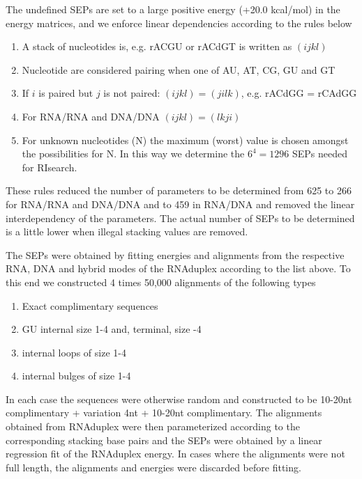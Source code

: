 The undefined SEPs are set to a large positive energy (+20.0 kcal/mol) in the energy matrices, and we enforce linear dependencies according to the rules below

\begin{enumerate}
\item A stack of nucleotides is, e.g. rACGU or rACdGT is written as $(\mathit{ijkl})$

\item Nucleotide are considered pairing when one of AU, AT, CG, GU and GT

\item If $i$ is paired but $j$ is not paired: $(\mathit{ijkl}) = (\mathit{jilk})$, e.g. rACdGG = rCAdGG

\item For RNA/RNA and DNA/DNA $(\mathit{ijkl}) = (\mathit{lkji})$

\item For unknown nucleotides (N) the maximum (worst) value is chosen amongst the possibilities for N. In this way we determine the $6^4 = 1296$ SEPs needed for RIsearch.
\end{enumerate}

These rules reduced the number of parameters to be determined from 625 to 266 for RNA/RNA and DNA/DNA and to 459 in RNA/DNA and removed the linear interdependency of the parameters.
The actual number of SEPs to be determined is a little lower when illegal stacking values are removed.

The SEPs were obtained by fitting energies and alignments from the respective RNA, DNA and hybrid modes of the RNAduplex according to the list above.
To this end we constructed 4 times 50,000 alignments of the following types

\begin{enumerate}
\item Exact complimentary sequences

\item GU internal size 1-4 and, terminal, size -4

\item internal loops of size 1-4

\item internal bulges of size 1-4
\end{enumerate}

In each case the sequences were otherwise random and constructed to be 10-20nt complimentary + variation 4nt + 10-20nt complimentary.
The alignments obtained from RNAduplex were then parameterized according to the corresponding stacking base pairs and the SEPs were obtained by a linear regression fit of the RNAduplex energy.
In cases where the alignments were not full length, the alignments and energies were discarded before fitting.

